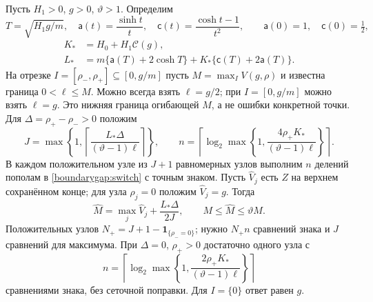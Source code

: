 \begin{proposition}
\label{boundarygap:budget}\label{joint:budget}
Пусть $H_1>0$, $g>0$, $\vartheta>1$. Определим
\[
 T=\sqrt{H_1g/m},\quad
 \mathsf a(t)=\frac{\sinh t}{t},\quad
 \mathsf c(t)=\frac{\cosh t-1}{t^2},\qquad
 \mathsf a(0)=1,\quad\mathsf c(0)=\tfrac12,
\]
\begin{equation}\label{compact:scalar-constants}
\begin{aligned}
 K_*&=H_0+H_1\mathcal C(g),\\
 L_*&=m\{\mathsf a(T)+2\cosh T\}
       +K_*\{\mathsf c(T)+2\mathsf a(T)\}.
\end{aligned}
\end{equation}
На отрезке $I=[\rho_-,\rho_+]\subseteq[0,g/m]$ пусть
$M=\max_I V(g,\rho)$ и известна граница $0<\ell\le M$.
Можно всегда взять $\ell=g/2$; при $I=[0,g/m]$ можно взять $\ell=g$.
Это нижняя граница огибающей $M$, а не ошибки конкретной точки.
Для $\Delta=\rho_+-\rho_->0$ положим
\begin{equation}\label{compact:interval-budget}
 J=\max\left\{1,\left\lceil\frac{L_*\Delta}
                       {(\vartheta-1)\ell}\right\rceil\right\},
 \qquad n=\left\lceil\log_2\max\left\{1,
       \frac{4\rho_+K_*}{(\vartheta-1)\ell}\right\}\right\rceil.
\end{equation}
В каждом положительном узле из $J+1$ равномерных узлов выполним $n$
делений пополам в \eqref{boundarygap:switch} с точным знаком.
Пусть $\widehat V_j$ есть $Z$ на верхнем сохранённом конце;
для узла $\rho_j=0$ положим $\widehat V_j=g$.
Тогда
\begin{equation}\label{boundarygap:finite-enclosure}
 \widehat M=\max_j\widehat V_j+\frac{L_*\Delta}{2J},
 \qquad M\le\widehat M\le\vartheta M.
\end{equation}
Положительных узлов $N_+=J+1-\mathbf1_{\{\rho_-=0\}}$;
нужно $N_+n$ сравнений знака и $J$ сравнений для максимума.
При $\Delta=0$, $\rho_+>0$ достаточно одного узла с
\begin{equation}\label{energy:scalar-budget}
 n=\left\lceil\log_2\max\left\{1,
       \frac{2\rho_+K_*}{(\vartheta-1)\ell}\right\}\right\rceil
\end{equation}
сравнениями знака, без сеточной поправки. Для $I=\{0\}$ ответ равен $g$.
\end{proposition}

